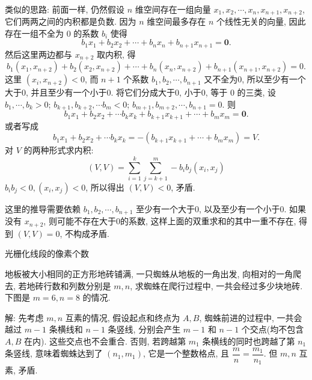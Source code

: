 ~

类似的思路: 前面一样, 仍然假设 $n$ 维空间存在一组向量 $x_1,x_2,\cdots,x_n,x_{n+1},x_{n+2}$, 它们两两之间的内积都是负数. 因为 $n$ 维空间最多存在 $n$ 个线性无关的向量, 因此存在一组不全为 0 的系数 $b_i$ 使得
\[b_1x_1 + b_2x_2 + \cdots + b_nx_n + b_{n+1}x_{n+1}=\mathbf{0}.\]
然后这里两边都与 $x_{n+2}$ 取内积, 得
\[b_1(x_1,x_{n+2}) + b_2(x_2,x_{n+2}) + \cdots + b_n(x_n,x_{n+2}) + b_{n+1}(x_{n+1},x_{n+2}) = 0 .\]
这里 $(x_i,x_{n+2}) < 0$, 而 $n+1$ 个系数 $b_1,b_2,\cdots,b_{n+1}$ 又不全为0, 所以至少有一个大于0, 并且至少有一个小于0. 将它们分成大于0, 小于0, 等于 0 的三类, 设 $b_1,\cdots,b_k > 0$; $b_{k+1},b_{k+2},\cdots b_m < 0$; $b_{m+1},b_{m+2},\cdots,b_{n+1} = 0$. 则
\[b_1x_1 + b_2x_2 + \cdots b_kx_k + b_{k+1}x_{k+1} + \cdots + b_mx_m = \mathbf{0} .\]
或者写成
\[b_1x_1 + b_2x_2 + \cdots b_kx_k = -(b_{k+1}x_{k+1} + \cdots + b_mx_m ) = V.\]
对 $V$ 的两种形式求内积:
\[(V,V) = \sum_{i=1}^k\sum_{j=k+1}^m -b_ib_j(x_i,x_j) \]
$b_ib_j < 0,(x_i,x_j) < 0$, 所以得出 $(V,V) < 0$, 矛盾.

这里的推导需要依赖 $b_1,b_2,\cdots,b_{n+1}$ 至少有一个大于0, 以及至少有一个小于0. 如果没有 $x_{n+2}$, 则可能不存在大于0的系数, 这样上面的双重求和的其中一重不存在, 得到 $(V,V) = 0$, 不构成矛盾.


\newpage

\noindent 光栅化线段的像素个数

地板被大小相同的正方形地砖铺满, 一只蜘蛛从地板的一角出发, 向相对的一角爬去, 若地砖行数和列数分别是 $m,n$, 求蜘蛛在爬行过程中, 一共会经过多少块地砖. 下图是 $m = 6, n = 8$ 的情况.
\begin{figure*}[htbp]
\centering
{}
\end{figure*}

解: 先考虑 $m,n$ 互素的情况, 假设起点和终点为 $A,B$, 蜘蛛前进的过程中, 一共会越过 $m - 1$ 条横线和 $n - 1$ 条竖线, 分别会产生 $m - 1$ 和 $n - 1$ 个交点(均不包含 $A,B$ 在内). 这些交点也不会重合. 否则, 若跨越第 $m_1$ 条横线的同时也跨越了第 $n_1$ 条竖线, 意味着蜘蛛达到了 $(n_1, m_1)$, 它是一个整数格点, 且 $\dfrac{m}{n} = \dfrac{m_1}{n_1}$. 但 $m,n$ 互素, 矛盾. 

